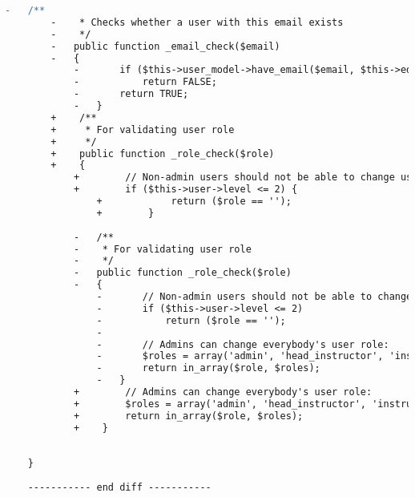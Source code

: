 \begin{lstlisting}[language=diff, caption=Perubahan pada kode Profile.php]
		-	/**
		-	 * Checks whether a user with this email exists
		-	 */
		-	public function _email_check($email)
		-	{
			-		if ($this->user_model->have_email($email, $this->edit_username))
			-			return FALSE;
			-		return TRUE;
			-	}
		+    /**
		+     * For validating user role
		+     */
		+    public function _role_check($role)
		+    {
			+        // Non-admin users should not be able to change user role:
			+        if ($this->user->level <= 2) {
				+            return ($role == '');
				+        }
			
			-	/**
			-	 * For validating user role
			-	 */
			-	public function _role_check($role)
			-	{
				-		// Non-admin users should not be able to change user role:
				-		if ($this->user->level <= 2)
				-			return ($role == '');
				-
				-		// Admins can change everybody's user role:
				-		$roles = array('admin', 'head_instructor', 'instructor', 'student');
				-		return in_array($role, $roles);
				-	}
			+        // Admins can change everybody's user role:
			+        $roles = array('admin', 'head_instructor', 'instructor', 'student');
			+        return in_array($role, $roles);
			+    }
		
		
	}
	
	----------- end diff -----------
\end{lstlisting}

